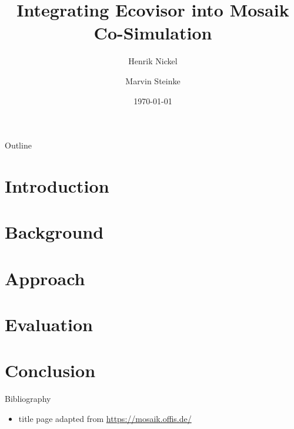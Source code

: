 \documentclass[aspectratio=169, 10pt]{beamer}
\title[Ecovisor \& Mosaik Co-Simulation]{
    Integrating Ecovisor into Mosaik Co-Simulation
}
\author[Steinke \and Nickel]{Henrik Nickel \and Marvin Steinke}
\institute{Technische Universität Berlin}
\date{\today}
\begin{document}
\frame[plain]{\titlepage}
\begin{frame}{Outline}
    \begin{center}
        \tableofcontents
    \end{center}
\end{frame}

\section{Introduction}
\frame{\sectionpage}


\section{Background}
\frame{\sectionpage}


\section{Approach}
\frame{\sectionpage}


\section{Evaluation}
\frame{\sectionpage}


\section{Conclusion}
\frame{\sectionpage}


\appendix
\begin{frame}[noframenumbering]{Bibliography}


\vspace{4mm}
\begin{itemize}
    \item title page adapted from \url{https://mosaik.offis.de/}
\end{itemize}
\end{frame}
\end{document}
